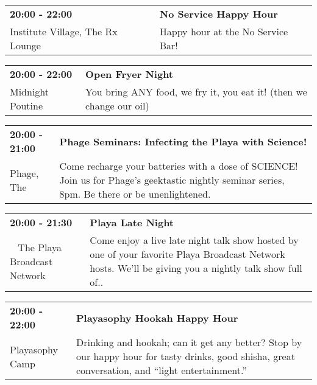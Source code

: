 \begin{tabular}{ p{1in} p{2.2in} }
    \textbf{20:00 - 22:00} & \textbf{No Service Happy Hour} \\
    Institute Village, The \newline Rx Lounge & Happy hour at the No Service Bar! \\
    \hline 
\end{tabular}
    
\begin{tabular}{ p{1in} p{2.2in} }
    \textbf{20:00 - 22:00} & \textbf{Open Fryer Night} \\
    Midnight Poutine \newline  & You bring ANY food, we fry it, you eat it! (then we change our oil) \\
    \hline 
\end{tabular}
    
\begin{tabular}{ p{1in} p{2.2in} }
    \textbf{20:00 - 21:00} & \textbf{Phage Seminars: Infecting the Playa with Science!} \\
    Phage, The \newline  & Come recharge your batteries with a dose of SCIENCE! Join us for Phage's geektastic nightly seminar series, 8pm. Be there or be unenlightened. \\
    \hline 
\end{tabular}
    
\begin{tabular}{ p{1in} p{2.2in} }
    \textbf{20:00 - 21:30} & \textbf{Playa Late Night} \\
    ~ \newline The Playa Broadcast Network & Come enjoy a live late night talk show hosted by one of your favorite Playa Broadcast Network hosts. We'll be giving you a nightly talk show full of.. \\
    \hline 
\end{tabular}
    
\begin{tabular}{ p{1in} p{2.2in} }
    \textbf{20:00 - 22:00} & \textbf{Playasophy Hookah Happy Hour} \\
    Playasophy Camp \newline  & Drinking and hookah; can it get any better? Stop by our happy hour for tasty drinks, good shisha, great conversation, and ``light entertainment.'' \\
    \hline 
\end{tabular}
    
